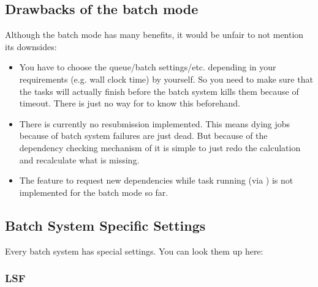 \documentclass[letterpaper,10pt,english]{sphinxmanual}
\begin{document}
\subsection{Drawbacks of the batch mode}
\label{\detokenize{usage/batch:drawbacks-of-the-batch-mode}}
Although the batch mode has many benefits, it would be unfair to not mention its downsides:
\begin{itemize}
\item {} 
You have to choose the queue/batch settings/etc. depending in your requirements (e.g. wall clock time) by yourself.
So you need to make sure that the tasks will actually finish before the batch system kills them because of timeout.
There is just no way for  to know this beforehand.

\item {} 
There is currently no resubmission implemented.
This means dying jobs because of batch system failures are just dead.
But because of the dependency checking mechanism of  it is simple to just redo the calculation
and re\sphinxhyphen{}calculate what is missing.

\item {} 
The  feature to request new dependencies while task running (via ) is not implemented for
the batch mode so far.

\end{itemize}


\subsection{Batch System Specific Settings}
\label{\detokenize{usage/batch:batch-system-specific-settings}}
Every batch system has special settings.
You can look them up here:


\subsubsection{LSF}
\label{\detokenize{usage/batch:lsf}}
\end{document}
